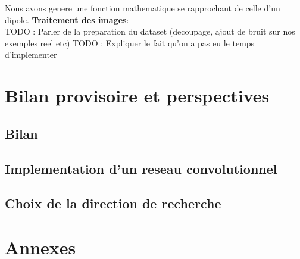 \documentclass[a4paper, 12pt, titlepage, oneside]{article}
\begin{document}
	Nous avons genere une fonction mathematique se rapprochant de celle d'un dipole. 
	\textbf{Traitement des images}:\\
	TODO : Parler de la preparation du dataset (decoupage, ajout de bruit sur nos exemples reel etc)
	TODO : Expliquer le fait qu'on a pas eu le temps d'implementer
\newpage
\section{Bilan provisoire et perspectives}
	\subsection{Bilan} %
	\subsection{Implementation d'un reseau convolutionnel}
	\subsection{Choix de la direction de recherche}

\newpage
\section{Annexes}

\medskip
\newpage
\printbibliography
\end{document}
